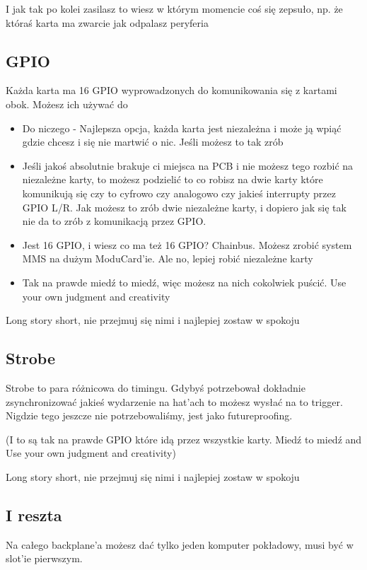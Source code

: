 \documentclass[b5paper, 10pt, twoside]{book}
\begin{document}
I jak tak po kolei zasilasz to wiesz w którym momencie coś się zepsuło, np. że któraś karta ma zwarcie jak odpalasz peryferia

\subsection{GPIO}
Każda karta ma 16 GPIO wyprowadzonych do komunikowania się z kartami obok. Możesz ich używać do
\begin{itemize}
  \item Do niczego - Najlepsza opcja, każda karta jest niezależna i może ją wpiąć gdzie chcesz i się nie martwić o nic. Jeśli możesz to tak zrób
  \item Jeśli jakoś absolutnie brakuje ci miejsca na PCB i nie możesz tego rozbić na niezależne karty, to możesz podzielić to co robisz na dwie karty które komunikują się czy to cyfrowo czy analogowo czy jakieś interrupty przez GPIO L/R. Jak możesz to zrób dwie niezależne karty, i dopiero jak się tak nie da to zrób z komunikacją przez GPIO.
  \item Jest 16 GPIO, i wiesz co ma też 16 GPIO? Chainbus. Możesz zrobić system MMS na dużym ModuCard'ie. Ale no, lepiej robić niezależne karty
  \item Tak na prawde miedź to miedź, więc możesz na nich cokolwiek puścić. Use your own judgment and creativity
\end{itemize}

Long story short, nie przejmuj się nimi i najlepiej zostaw w spokoju
\subsection{Strobe}
Strobe to para różnicowa do timingu. Gdybyś potrzebował dokładnie zsynchronizować jakieś wydarzenie na hat'ach to możesz wysłać na to trigger. Nigdzie tego jeszcze nie potrzebowaliśmy, jest jako futureproofing.

(I to są tak na prawde GPIO które idą przez wszystkie karty. Miedź to miedź and Use your own judgment and creativity)

Long story short, nie przejmuj się nimi i najlepiej zostaw w spokoju

\subsection{I reszta}

Na całego backplane'a możesz dać tylko jeden komputer pokładowy, musi być w slot'ie pierwszym.
\end{document}
